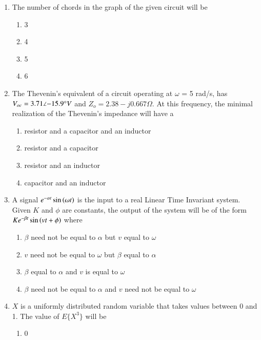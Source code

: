 \documentclass[journal]{IEEEtran}
\begin{document}
\begin{enumerate}
\item The number of chords in the graph of the given circuit will be
\begin{figure}[!ht]
\centering
\resizebox{0.5\textwidth}{!}{%

}%
\end{figure}
    \begin{enumerate}
        \item 3
        \item 4
        \item 5
        \item 6 \\
    \end{enumerate}
\item The Thevenin's equivalent of a circuit operating at $\omega$ = 5 rad/s, has $V_{oc} = 3.71\angle{-15.9\degree} V$ and $Z_o = 2.38 - j0.667\Omega$. At this frequency, the minimal realization of the Thevenin's impedance will have a
\begin{enumerate}
    \item resistor and a capacitor and an inductor
    \item resistor and a capacitor
    \item resistor and an inductor
    \item capacitor and an inductor \\
\end{enumerate}
\item A signal $e^{-\alpha t}\sin\left(\omega t\right)$ is the input to a real Linear Time Invariant system. Given $K$ and $\phi$ are constants, the output of the system will be of the form $Ke^{-\beta t}\sin\left(vt+\phi\right)$ where
\begin{enumerate}
    \item $\beta$ need not be equal to $\alpha$ but $v$ equal to $\omega$
    \item $v$ need not be equal to $\omega$ but $\beta$ equal to $\alpha$
    \item $\beta$ equal to $\alpha$ and $v$ is equal to $\omega$
    \item $\beta$ need not be equal to $\alpha$ and $v$ need not be equal to $\omega$ \\
\end{enumerate}
\item $X$ is a uniformly distributed random variable that takes values between 0 and 1. The value of $E\{X^3\}$ will be
 \begin{enumerate}
     \item 0

\end{enumerate}
\end{enumerate}
\end{document}
